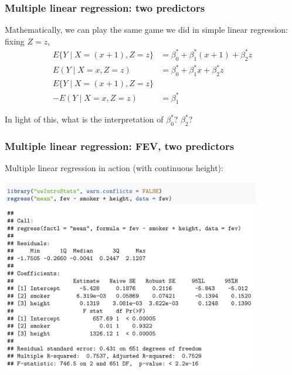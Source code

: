 \documentclass[12pt, 
hyperref={colorlinks=true, linkcolor=blue, urlcolor=cyan},dvipsnames]{beamer}
\begin{document}
\begin{frame}
\frametitle{Multiple linear regression: two predictors}

Mathematically, we can play the same game we did in simple linear regression: fixing $Z = z$, 
\begin{align*}
E\{Y \mid X = (x + 1), Z = z\} &= \beta_0^* + \beta_1^* (x + 1) + \beta_2^* z \\
E(Y \mid X = x, Z = z) &= \beta_0^* + \beta_1^* x + \beta_2^* z \\
E\{Y \mid X = (x + 1), Z = z\} & \\
- E(Y \mid X = x, Z = z) &= \beta_1^*
\end{align*}

In light of this, what is the interpretation of $\beta_0^*$? $\beta_2^*$? \vspace{2cm}
\end{frame}

\begin{frame}
\frametitle{Multiple linear regression: FEV, two predictors}
Multiple linear regression in action (with continuous height): \vspace{-0.45cm}
\begin{center}
\includegraphics[width = 0.85\textwidth]{plots/fev_vs_smoke_adjust_height.png}
\end{center}
\end{frame}
\end{document}
